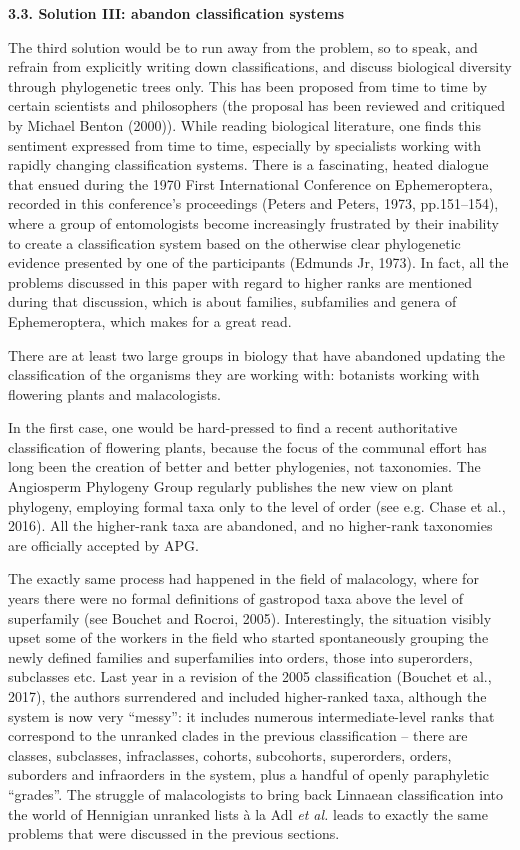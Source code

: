\documentclass[a4paper]{article}
\begin{document}
{\bfseries
3.3. Solution III: abandon classification systems}

The third solution would be to run away from the problem, so to speak, and refrain from explicitly writing down
classifications, and discuss biological diversity through phylogenetic trees only. This has been proposed from time to
time by certain scientists and philosophers (the proposal has been reviewed and critiqued by Michael Benton
\label{ref:RNDvl4WtKWtke}(2000)). While reading biological literature, one finds this sentiment expressed from time to
time, especially by specialists working with rapidly changing classification systems. There is a fascinating, heated
dialogue that ensued during the 1970 First International Conference on Ephemeroptera, recorded in this conference’s
proceedings \label{ref:RNDKBHKSFREeT}(Peters and Peters, 1973, pp.151–154), where a group of entomologists become
increasingly frustrated by their inability to create a classification system based on the otherwise clear phylogenetic
evidence presented by one of the participants \label{ref:RNDRwD3oy2Fl1}(Edmunds Jr, 1973). In fact, all the problems
discussed in this paper with regard to higher ranks are mentioned during that discussion, which is about families,
subfamilies and genera of Ephemeroptera, which makes for a great read.

There are at least two large groups in biology that have abandoned updating the classification of the organisms they are
working with: botanists working with flowering plants and malacologists.

In the first case, one would be hard-pressed to find a recent authoritative classification of flowering plants, because
the focus of the communal effort has long been the creation of better and better phylogenies, not taxonomies. The
Angiosperm Phylogeny Group regularly publishes the new view on plant phylogeny, employing formal taxa only to the level
of order \label{ref:RNDly7gwmyvG1}(see e.g. Chase et al., 2016). All the higher-rank taxa are abandoned, and no
higher-rank taxonomies are officially accepted by APG.

The exactly same process had happened in the field of malacology, where for years there were no formal definitions of
gastropod taxa above the level of superfamily \label{ref:RND5saL769IKK}(see Bouchet and Rocroi, 2005). Interestingly,
the situation visibly upset some of the workers in the field who started spontaneously grouping the newly defined
families and superfamilies into orders, those into superorders, subclasses etc. Last year in a revision of the 2005
classification \label{ref:RNDSnxh8fRQNP}(Bouchet et al., 2017), the authors surrendered and included higher-ranked
taxa, although the system is now very “messy”: it includes numerous intermediate-level ranks that correspond to the
unranked clades in the previous classification – there are classes, subclasses, infraclasses, cohorts, subcohorts,
superorders, orders, suborders and infraorders in the system, plus a handful of openly paraphyletic “grades”. The
struggle of malacologists to bring back Linnaean classification into the world of Hennigian unranked lists à la Adl
\textit{et al.} leads to exactly the same problems that were discussed in the previous sections.
\end{document}
